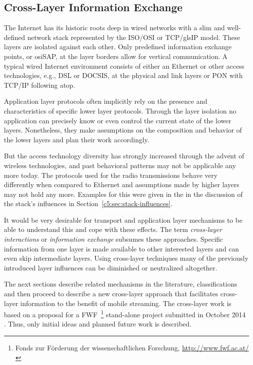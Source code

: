 \subsection{Cross-Layer Information Exchange}
\label{c5:sec:crosslayerhinting}

The Internet has its historic roots deep in wired networks with a slim and well-defined network stack represented by the \gls{ISO}/\gls{OSI} or \gls{TCP}/gls{IP} model. These layers are isolated against each other. Only predefined information exchange points, or \gls{osiSAP}, at the layer borders allow for vertical communication. A typical wired Internet environment consists of either an Ethernet or other access technologies, e.g., \gls{DSL} or \gls{DOCSIS}, at the physical and link layers or \gls{PON} with \gls{TCP}/\gls{IP} following atop.

Application layer protocols often implicitly rely on the presence and characteristics of specific lower layer protocols. Through the layer isolation no application can precisely know or even control the current state of the lower layers. Nonetheless, they make assumptions on the composition and behavior of the lower layers and plan their work accordingly. 

But the access technology diversity has strongly increased through the advent of wireless technologies, and past behavioral patterns may not be applicable any more today. The protocols used for the radio transmissions behave very differently when compared to Ethernet and assumptions made by higher layers may not hold any more. Examples for this were given in the in the discussion of the stack's influences in Section~\ref{c5:sec:stack-influences}.

It would be very desirable for transport and application layer mechanisms to be able to understand this and cope with these effects. The term \textit{cross-layer interactions} or \textit{information exchange} subsumes these approaches. Specific information from one layer is made available to other interested layers and can even skip intermediate layers. Using cross-layer techniques many of the previously introduced layer influences can be diminished or neutralized altogether.

The next sections describe related mechanisms in the literature, classifications and then proceed to describe a new cross-layer approach that facilitates cross-layer information to the benefit of mobile streaming. The cross-layer work is based on a proposal for a FWF~\footnote{Fonds zur Förderung der wissenschaftlichen Forschung, \url{http://www.fwf.ac.at/}} stand-alone project submitted in October 2014 . Thus, only initial ideas and planned future work is described.


